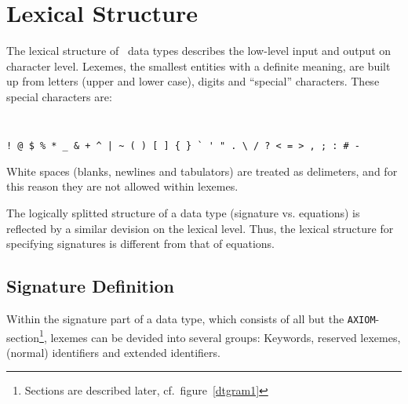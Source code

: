 \section{Lexical Structure}

The lexical structure of \redux\ data types describes the low-level input 
and output on character level.
Lexemes, the smallest entities with a definite meaning,
are built up from letters (upper and lower case), digits
and ``special'' characters. These special characters are:

{\tt
\begin{verbatim}
! @ $ % * _ & + ^ | ~ ( ) [ ] { } ` ' " . \ / ? < = > , ; : # -
\end{verbatim}}

White spaces (blanks, newlines and tabulators) are treated as delimeters, 
and for this reason they are not allowed within lexemes.

The logically splitted structure of a data type (signature vs. equations) is
reflected by a similar devision on the lexical level. Thus, the lexical
structure for specifying signatures is different from that of equations.

\subsection{Signature Definition}

Within the signature part of a data type, which consists of all but the
{\tt AXIOM}-section\footnote{Sections are described later, cf.\ 
figure~\ref{dtgram1}},
lexemes can be devided into several groups: Keywords, reserved lexemes,
(normal) identifiers and extended identifiers.

